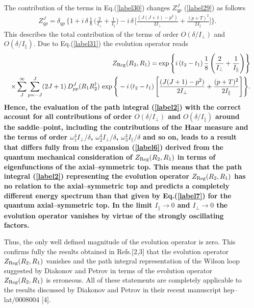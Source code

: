 \documentclass[a4paper,11pt]{article}
\begin{document}
The contribution of the terms in Eq.(\ref{label30}) changes $Z^J_{qp}$
(\ref{label29}) as follows
%
\begin{eqnarray}\label{label31}
Z^J_{qp} = \delta_{qp}\,\Bigg\{1
+ i\,\delta\,\frac{1}{8}\,\Bigg(\frac{2}{I_{\perp}}+
\frac{1}{I_{\parallel}}\Bigg) - i\,\delta\,\Bigg[\frac{(J(J+1) -
p^2)}{2I_{\perp}} + \frac{(p + T)^2}{2I_{\parallel}}\Bigg]\Bigg\}.
\end{eqnarray}
%
This describes the total contribution of the terms of order
$O(\delta/I_{\perp})$ and $O(\delta/I_{\parallel})$. Due to
Eq.(\ref{label31}) the evolution operator reads
%
\begin{eqnarray}\label{label32}
&&Z_{\rm Reg}(R_2,R_1) =
\exp\Bigg\{i\,(t_2-t_1)\,\frac{1}{8}\,\Bigg(\frac{2}{I_{\perp}}+
\frac{1}{I_{\parallel}}\Bigg)\Bigg\}\nonumber\\
&&\times\sum^{\infty}_{J}\sum^{J}_{p= -J}(2J +
1)\,D^J_{pp}(R_1R^{\dagger}_2)\,\exp\Bigg\{-i\,(t_2-t_1)\,
\Bigg[\frac{(J(J+1) - p^2)}{2I_{\perp}} + \frac{(p +
T)^2}{2I_{\parallel}}\Bigg]\Bigg\}.
\end{eqnarray}
%
{\bf Hence, the evaluation of the path integral (\ref{label2}) with
the correct account for all contributions of order
$O(\delta/I_{\perp})$ and $O(\delta/I_{\parallel})$ around the
saddle--point, including the contributions of the Haar measure and the
terms of order $\omega^4_1I_{\perp}/\delta$,
$\omega^4_2I_{\perp}/\delta$, $\omega^4_3I_{\parallel}/\delta$ and so on,
leads to a result that differs fully from the expansion (\ref{label6})
derived from the quantum mechanical consideration of $Z_{\rm Reg}(R_2,
R_1)$ in terms of eigenfunctions of the axial--symmetric top. This
means that the path integral (\ref{label2}) representing the evolution
operator $Z_{\rm Reg}(R_2, R_1)$ has no relation to the
axial--symmetric top and predicts a completely different energy
spectrum than that given by Eq.(\ref{label7}) for the quantum
axial--symmetric top. In the limit $I_{\parallel} \to 0$ and
$I_{\perp} \to 0$ the evolution operator vanishes by virtue of the
strongly oscillating factors.}

Thus, the only well defined magnitude of the evolution operator is
zero. This confirms fully the results obtained in Refs.[2,3] that the
evolution operator $Z_{\rm Reg}(R_2, R_1)$ vanishes and the path
integral representation of the Wilson loop suggested by Diakonov and
Petrov in terms of the evolution operator $Z_{\rm Reg}(R_2, R_1)$ is
erroneous. All of these statements are completely applicable to the
results discussed by Diakonov and Petrov in their recent manuscript
hep--lat/0008004 [4].
\end{document}
